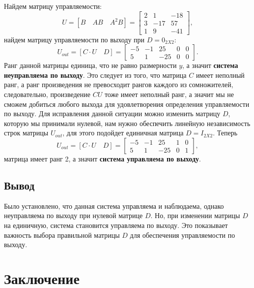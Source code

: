 Найдем матрицу управляемости:
\begin{equation*}
    U=[B\quad AB\quad A^2B]=\begin{bmatrix}
        2&	1&	-18\\
        3&	-17&	57\\
        1&	9&	-41
    \end{bmatrix},
\end{equation*}
найдем матрицу управляемости по выходу при $D=0_{2X2}$:
\begin{equation*}
    U_{out}=[C\cdot U\quad D]=\begin{bmatrix}
        -5&    -1&    25&     0&     0\\
        5 &    1&   -25  &   0&     0
    \end{bmatrix}.
\end{equation*}
Ранг данной матрицы единица, что не равно размерности $y$, а значит
\textbf{система неуправляема по выходу}. Это следует из того, что
матрица $C$ имеет неполный ранг, а  ранг произведения не превосходит 
рангов каждого из сомножителей, следовательно, произведение $CU$
тоже имеет неполный ранг, а значит мы не сможем добиться любого выхода
для удовлетворения определения управляемости по выходу. Для исправления
данной ситуации можно изменить матрицу $D$, которую мы принимали нулевой,
нам нужно обеспечить линейную независимость строк матрицы $U_{out}$,
для этого подойдет единичная матрица $D=I_{2X2}$. Теперь
\begin{equation*}
    U_{out}=[C\cdot U\quad D]=\begin{bmatrix}
        -5&    -1&    25&     1&     0\\
        5 &    1&   -25  &   0&     1
    \end{bmatrix},
\end{equation*}
матрица имеет ранг 2, а значит \textbf{система управляема по выходу}.

\subsection{Вывод}

Было установлено, что данная система управляема и наблюдаема, однако
неуправляема по выходу при нулевой матрице $D$. Но, при изменении 
матрицы $D$ на единичную, система становится управляема по выходу. 
Это показывает важность выбора правильной матрицы $D$ для обеспечения 
управляемости по выходу.

\section{Заключение}

